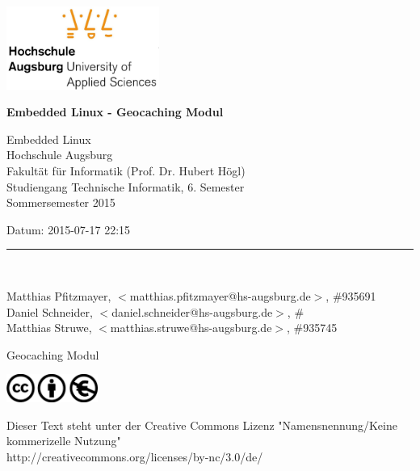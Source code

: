




















\ \ 
\hfill
\begin{minipage}[t]{5cm}
\includegraphics[width=5cm]{img/hsa-logo.jpg}
\end{minipage}

\vskip 10mm

{\parindent=0pt

\thispagestyle{empty}


{\Large\bf Embedded Linux - Geocaching Modul
}

\vskip 5mm

Embedded Linux \\
Hochschule Augsburg \\
Fakultät für Informatik (Prof. Dr. Hubert Högl) \\
Studiengang Technische Informatik, 6. Semester \\

Sommersemester 2015
 

Datum: 2015-07-17 22:15 \\

\medskip

\rule{10cm}{4pt}\\

\medskip

Matthias Pfitzmayer, $<$matthias.pfitzmayer@hs-augsburg.de$>$, \#935691 \\
Daniel Schneider, $<$daniel.schneider@hs-augsburg.de$>$, \# \\
Matthias Struwe, $<$matthias.struwe@hs-augsburg.de$>$, \#935745 \\


\vskip 2cm

\begin{center}
{\LARGE\bf

Geocaching Modul

}
\end{center}

\vfill

\begin{minipage}[t]{3cm}
\includegraphics[width=3cm]{img/cc-logo.jpg}
\end{minipage}

{\small
Dieser Text steht unter der Creative Commons Lizenz "Namensnennung/Keine kommerizelle Nutzung"\\
http://creativecommons.org/licenses/by-nc/3.0/de/
}

} %


\newpage
